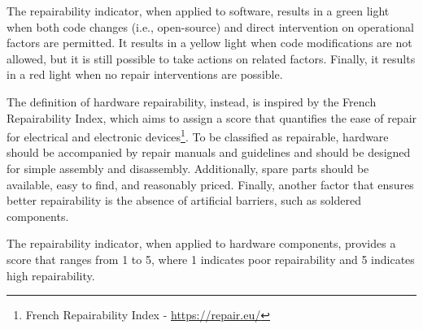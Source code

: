 The repairability indicator, when applied to software, results in a green light when both code changes (i.e., open-source) and direct intervention on operational factors are permitted. It results in a yellow light when code modifications are not allowed, but it is still possible to take actions on related factors. Finally, it results in a red light when no repair interventions are possible.

The definition of hardware repairability, instead, is inspired by the French Repairability Index, which aims to assign a score that quantifies the ease of repair for electrical and electronic devices\footnote{French Repairability Index - \href{https://repair.eu/it/news/the-french-repair-index-challenges-and-opportunities/}{https://repair.eu/}}. To be classified as repairable, hardware should be accompanied by repair manuals and guidelines and should be designed for simple assembly and disassembly. Additionally, spare parts should be available, easy to find, and reasonably priced. Finally, another factor that ensures better repairability is the absence of artificial barriers, such as soldered components.

The repairability indicator, when applied to hardware components, provides a score that ranges from 1 to 5, where 1 indicates poor repairability and 5 indicates high repairability.

\bigskip

